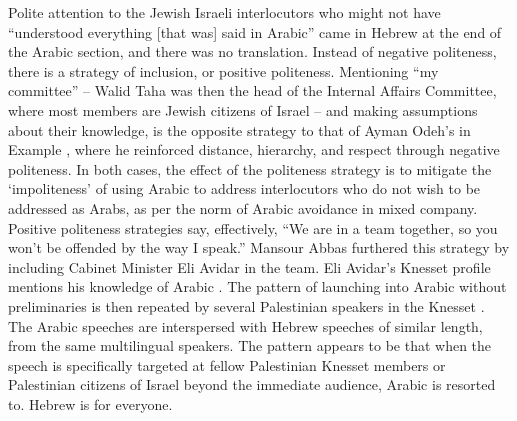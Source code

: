 \documentclass[output=paper,arabicfont]{langscibook}
\begin{document}
Polite attention to the Jewish Israeli interlocutors who might not have “understood everything [that was] said in Arabic” came in Hebrew at the end of the Arabic section, and there was no translation. Instead of negative politeness, there is a strategy of inclusion, or positive politeness. Mentioning “my committee” – Walid Taha was then the head of the Internal Affairs Committee, where most members are Jewish citizens of Israel – and making assumptions about their knowledge, is the opposite strategy to that of Ayman Odeh’s in Example , where he reinforced distance, hierarchy, and respect through negative politeness. In both cases, the effect of the politeness strategy is to mitigate the ‘impoliteness' of using Arabic to address interlocutors who do not wish to be addressed as Arabs, as per the norm of Arabic avoidance in mixed company. Positive politeness strategies say, effectively, “We are in a team together, so you won’t be offended by the way I speak.” Mansour Abbas furthered this strategy by including Cabinet Minister Eli Avidar in the team. Eli Avidar’s Knesset profile mentions his knowledge of Arabic \citep{knesset-nd-a}. The pattern of launching into Arabic without preliminaries is then repeated by several Palestinian speakers in the Knesset \citep[46–51]{knesset2022-a}. The Arabic speeches are interspersed with Hebrew speeches of similar length, from the same multilingual speakers. The pattern appears to be that when the speech is specifically targeted at fellow Palestinian Knesset members or Palestinian citizens of Israel beyond the immediate audience, Arabic is resorted to. Hebrew is for everyone. 
\end{document}
